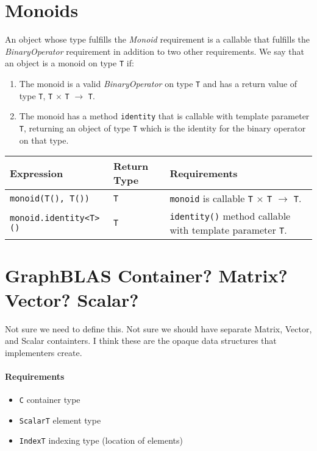 \section{Monoids}
An object whose type fulfills the \textit{Monoid} requirement is a callable that
fulfills the \textit{BinaryOperator} requirement in addition to two other requirements.
We say that an object is a monoid on type \texttt{T} if:

\begin{enumerate}
   \item The monoid is a valid \textit{BinaryOperator} on type \texttt{T} and has a return value of type \texttt{T}, \texttt{T} $\times$ \texttt{T} $\rightarrow$ \texttt{T}.
   \item The monoid has a method \texttt{identity} that is callable with template parameter \texttt{T}, returning an object of type \texttt{T} which is the identity for the binary operator on that type.
\end{enumerate}

\begin{tabularx}{\textwidth}{l l X}
\textbf{Expression} & \textbf{Return Type} & \textbf{Requirements}\\
\hline
\texttt{monoid(T(), T())} & \texttt{T} & \texttt{monoid} is callable \texttt{T} $\times$ \texttt{T} $\rightarrow$ \texttt{T}.\\
\hline
\texttt{monoid.identity<T>()} & \texttt{T} & \texttt{identity()} method callable with template parameter \texttt{T}.\\
\end{tabularx}

\section{GraphBLAS Container? Matrix? Vector? Scalar?}

Not sure we need to define this.  Not sure we should have separate Matrix, Vector, 
and Scalar containters. I think these are the opaque data structures that implementers create.


\paragraph{Requirements}
\begin{itemize} \itemsep0em
\item \texttt{C} container type
\item \texttt{ScalarT} element type
\item \texttt{IndexT} indexing type (location of elements)
\end{itemize}

